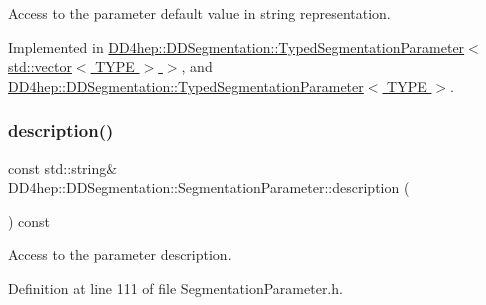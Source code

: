 Access to the parameter default value in string representation. 



Implemented in \hyperlink{class_d_d4hep_1_1_d_d_segmentation_1_1_typed_segmentation_parameter_3_01std_1_1vector_3_01_t_y_p_e_01_4_01_4_a399394999d0a86783838625ed8545c95}{D\+D4hep\+::\+D\+D\+Segmentation\+::\+Typed\+Segmentation\+Parameter$<$ std\+::vector$<$ T\+Y\+P\+E $>$ $>$}, and \hyperlink{class_d_d4hep_1_1_d_d_segmentation_1_1_typed_segmentation_parameter_a56ed62bf9808b631e25a76e79ff8a686}{D\+D4hep\+::\+D\+D\+Segmentation\+::\+Typed\+Segmentation\+Parameter$<$ T\+Y\+P\+E $>$}.

\hypertarget{class_d_d4hep_1_1_d_d_segmentation_1_1_segmentation_parameter_a426925cc561183c3d5d7c2a8afc4ceca}{}\label{class_d_d4hep_1_1_d_d_segmentation_1_1_segmentation_parameter_a426925cc561183c3d5d7c2a8afc4ceca} 
\subsubsection{\texorpdfstring{description()}{description()}}
{\footnotesize\ttfamily const std\+::string\& D\+D4hep\+::\+D\+D\+Segmentation\+::\+Segmentation\+Parameter\+::description (\begin{DoxyParamCaption}{ }\end{DoxyParamCaption}) const\hspace{0.3cm}{\ttfamily [inline]}}



Access to the parameter description. 



Definition at line 111 of file Segmentation\+Parameter.\+h.

\hypertarget{class_d_d4hep_1_1_d_d_segmentation_1_1_segmentation_parameter_a24de6da5ac6df1dff911b6b437e0f07f}{}\label{class_d_d4hep_1_1_d_d_segmentation_1_1_segmentation_parameter_a24de6da5ac6df1dff911b6b437e0f07f} 
